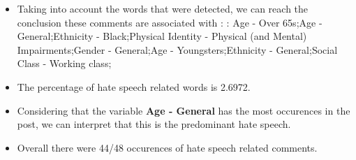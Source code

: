 \documentclass[11pt]{article}
\begin{document}
\begin{itemize}\item Taking into account the words that were detected, we can reach the conclusion these comments are associated with : : Age - Over 65s;Age - General;Ethnicity - Black;Physical Identity - Physical (and Mental) Impairments;Gender - General;Age - Youngsters;Ethnicity - General;Social Class - Working class;%

\item The percentage of hate speech related words is 2.6972.

\item Considering that the variable \textbf{Age - General} has the most occurences in the post, we can interpret that this is the predominant hate speech.

\item Overall there were 44/48 occurences of hate speech related comments.\end{itemize}
\end{document}
